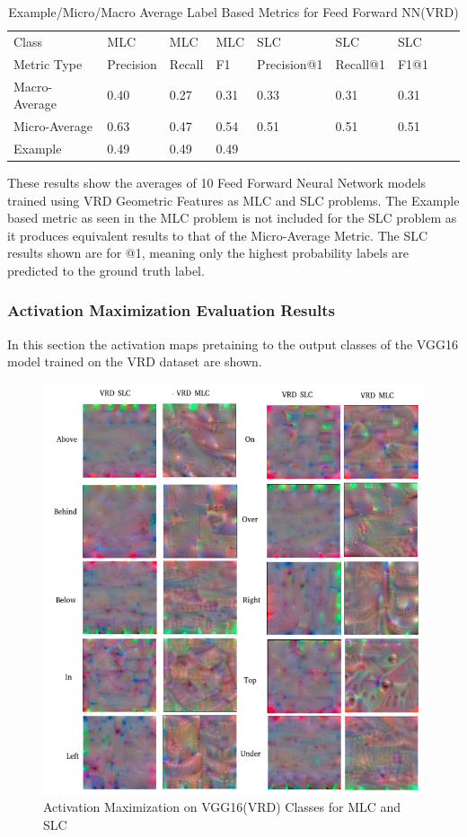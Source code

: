\documentclass{csfyp}
\begin{document}
\begin{table}[!htbp]
\begin{tabular}{|l|l|l|l|l|l|l|l|l}
\cline{1-7}
Class &  MLC  &  MLC  &  MLC & SLC &  SLC & SLC \\ \cline{1-7}
Metric Type  & Precision &  Recall & F1 & Precision@1 & Recall@1 & F1@1 \\ \cline{1-7}
Macro-Average &	0.40	&	0.27	&	0.31	&	0.33	&	0.31	&	0.31 \\ \cline{1-7}
Micro-Average &	0.63	&	0.47	&	0.54	&	0.51	&	0.51	&	0.51 \\ \cline{1-7}
Example       &	0.49	&	0.49	&	0.49 \\ \cline{1-4}
\end{tabular}
\caption{Example/Micro/Macro Average Label Based Metrics for Feed Forward NN(VRD)}
These results show the averages of 10 Feed Forward Neural Network models trained using VRD Geometric Features as MLC and SLC problems. The Example based metric as seen in the MLC problem is not included for the SLC problem as it produces equivalent results to that of the Micro-Average Metric.  The SLC results shown are for @1, meaning only the highest probability labels are predicted to the ground truth label.
\vspace{-4mm}
\end{table}

\subsubsection{Activation Maximization Evaluation Results}
In this section the activation maps pretaining to the output classes of the VGG16 model trained on the VRD dataset are shown.
\newpage
\begin{figure}[!htbp]
	\includegraphics[scale=0.60,center]{VRD_act.pdf}
	\caption{Activation Maximization on VGG16(VRD) Classes for MLC and SLC}
	\vspace{-4mm}
\end{figure}
\end{document}
